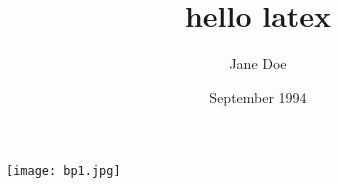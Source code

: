 \documentclass[a4paper,12pt]{article}
\title{hello latex}
\author{Jane Doe}
\date{September 1994}
\begin{document}
	\maketitle

\texttt{[image: bp1.jpg]}
\end{document}
